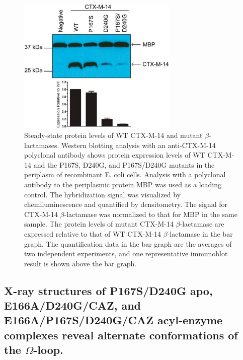 \documentclass[../main.tex]{subfiles}
\begin{document}
        \begin{figure}[!htb] %
            \centering
            \includegraphics[width=3in]{ch2-fig4.jpg}
            \caption[Steady-state protein levels of WT CTX-M-14 and mutant $\beta$-lactamases.]
                {Steady-state protein levels of WT CTX-M-14 and mutant $\beta$-lactamases. Western blotting analysis with an anti-CTX-M-14 polyclonal antibody shows protein expression levels of WT CTX-M-14 and the P167S, D240G, and P167S/D240G mutants in the periplasm of recombinant E. coli cells. Analysis with a polyclonal antibody to the periplasmic protein MBP was used as a loading control. The hybridization signal was visualized by chemiluminescence and quantified by densitometry. The signal for CTX-M-14 $\beta$-lactamase was normalized to that for MBP in the same sample. The protein levels of mutant CTX-M-14 $\beta$-lactamase are expressed relative to that of WT CTX-M-14 $\beta$-lactamase in the bar graph. The quantification data in the bar graph are the averages of two independent experiments, and one representative immunoblot result is shown above the bar graph.}
            \label{fig:ch2-fig4}
        \end{figure}

    \subsection{X-ray structures of P167S/D240G apo, E166A/D240G/CAZ, and E166A/P167S/D240G/CAZ acyl-enzyme complexes reveal alternate conformations of the $\Omega$-loop.}
\end{document}
